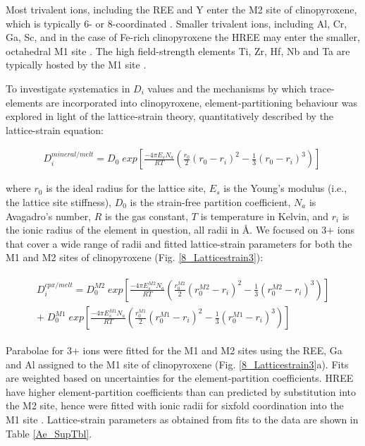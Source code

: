 \documentclass[review,authoryear,12pt]{elsarticle}
\begin{document}
Most trivalent ions, including the REE and Y enter the M2 site of clinopyroxene, which is typically 6- or 8-coordinated \citep{Deer1992}. Smaller trivalent ions, including Al, Cr, Ga, Sc, and in the case of Fe-rich clinopyroxene the HREE may enter the smaller, octahedral M1 site \citep{Olin2010, Bedard2014}. The high field-strength elements Ti, Zr, Hf, Nb and Ta are typically hosted by the M1 site \citep{Hill2000, Hill2011, Dygert2014}.

To investigate systematics in $D_i$ values and the mechanisms by which trace-elements are incorporated into clinopyroxene, element-partitioning behaviour was explored in light of the lattice-strain theory, quantitatively described by the lattice-strain equation: 

	\begin{align} %
	   D_i^{mineral/melt} = D_0 \; exp \left[\frac{-4\pi E_sN_a}{RT} \left(\frac{r_0}{2}(r_0-r_i)^2-\frac{1}{3}(r_0-r_i)^3\right)\right]\
	   \label{LST_eqn}
	\end{align}

	
\noindent where $r_0$ is the ideal radius for the lattice site, $E_s$ is the Young's modulus (i.e., the lattice site stiffness), $D_0$ is the strain-free partition coefficient, $N_a$ is Avagadro's number, $R$ is the gas constant, $T$ is temperature in Kelvin, and $r_i$ is the ionic radius of the element in question, all radii in \si{\angstrom}. We focused on 3+ ions that cover a wide range of radii and fitted lattice-strain parameters for both the M1 and M2 sites of clinopyroxene (Fig. \ref{8_Latticestrain3}):
		
	\begin{align} %
	\begin{split}
	   D_i^{cpx/melt} = D_0^{M2} \; exp \left[\frac{-4\pi E_s^{M2} N_a}{RT} \left(\frac{r_0^{M2}}{2}(r_0^{M2}-r_i)^2-\frac{1}{3}(r_0^{M2}-r_i)^3\right)\right] \\
  + \; D_0^{M1} \; exp \left[\frac{-4\pi E_s^{M1} N_a}{RT} \left(\frac{r_0^{M1}}{2}(r_0^{M1}-r_i)^2-\frac{1}{3}(r_0^{M1}-r_i)^3\right)\right]\
	\end{split}
	\label{LST_eqn_cpx}
	\end{align}
	
	\noindent Parabolae for 3+ ions were fitted for the M1 and M2 sites using the REE, Ga and Al assigned to the M1 site of clinopyroxene (Fig. \ref{8_Latticestrain3}a). Fits are weighted based on uncertainties for the element-partition coefficients. HREE have higher element-partition coefficients than can predicted by substitution into the M2 site, hence were fitted with ionic radii for sixfold coordination into the M1 site \citep[\textit{cf.}][]{Olin2010, Reguir2012}.
	Lattice-strain parameters as obtained from fits to the data are shown in Table \ref{Ae_SupTbl}.
	
\end{document}
